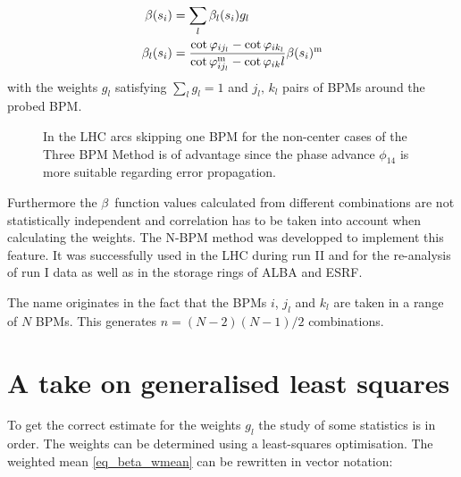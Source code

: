 \begin{align}
    \beta(s_i) &= \sum\limits_{l} \beta_l(s_i) g_l
    \label{eq_beta_wmean}\\
    \beta_l(s_i) &= \frac{\cot\varphi_{ij_l} - \cot\varphi_{ik_l}}{\cot\varphi_{ij_l}^\text{m} - \cot\varphi_{ik}l} \beta(s_i)^\text{m}
    \label{eq_beta_l}
\end{align}
with the weights $g_l$ satisfying
$%
    \sum\limits_l g_l = 1
$%
and $j_l,\,k_l$ pairs of BPMs around the probed BPM.


\begin{figure}
    \centering
    
    \caption{In the LHC arcs skipping one BPM for the non-center cases of the Three BPM Method
    is of advantage since the phase advance $\phi_{14}$
    is more suitable regarding error propagation.}
    \label{fig_skip_one_BPM}
\end{figure}

Furthermore the $\beta$~function values calculated from different combinations are not statistically
independent and correlation has to be taken into account when calculating the weights.
The N-BPM method \cite{LangnerNBPM, Langner2017} was developped to implement this feature.
It was successfully used in the LHC during run II and for the re-analysis of run I data
as well as in the storage rings of ALBA and ESRF.

The name originates in the fact that the BPMs $i$, $j_l$ and $k_l$ are taken in a range of $N$ BPMs.
This generates $n = (N-2)(N-1)/2$ combinations.


\section{A take on generalised least squares}

To get the correct estimate for the weights $g_l$ the study of some statistics is in order.
The weights can be determined using a least-squares optimisation. The weighted mean \eqref{eq_beta_wmean}
can be rewritten in vector notation:

